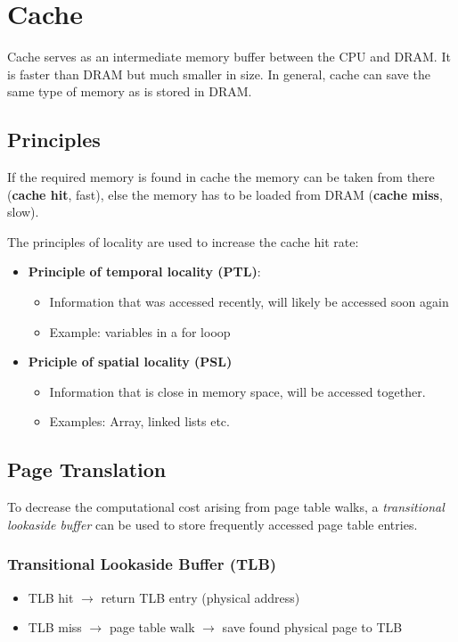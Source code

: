 \section{Cache}
Cache serves as an intermediate memory buffer between the CPU and DRAM. It is faster than DRAM but much smaller in size.
In general, cache can save the same type of memory as is stored in DRAM.
\subsection{Principles}

If the required memory is found in cache the memory can be taken from there (\textbf{cache hit}, fast), else the memory has to be loaded from DRAM (\textbf{cache miss}, slow).

\newpar{}

The principles of locality are used to increase the cache hit rate:
\begin{itemize}
    \item \textbf{Principle of temporal locality (PTL)}:
          \begin{itemize}
              \item Information that was accessed recently, will likely be accessed soon again
              \item Example: variables in a for looop
          \end{itemize}
    \item \textbf{Priciple of spatial locality (PSL)}
          \begin{itemize}
              \item Information that is close in memory space, will be accessed together.
              \item Examples: Array, linked lists etc.\
          \end{itemize}
\end{itemize}

\subsection{Page Translation}
To decrease the computational cost arising from page table walks, a \textit{transitional lookaside buffer} can be used to store frequently accessed page table entries.

\subsubsection{Transitional Lookaside Buffer (TLB)}
\begin{itemize}
    \item TLB hit $\to$ return TLB entry (physical address)
    \item TLB miss $\to$ page table walk $\to$ save found physical page to TLB
\end{itemize}

